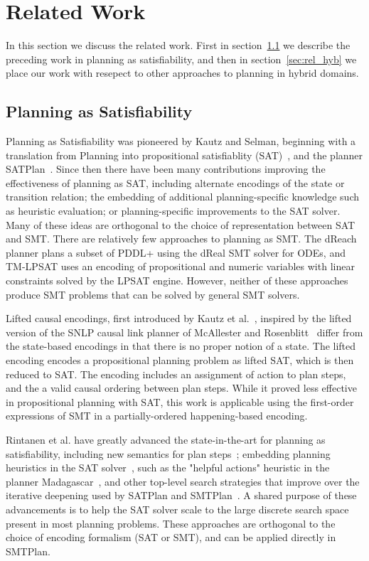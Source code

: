 \section{Related Work}\label{sec:related_work}

In this section we discuss the related work. First in section~\ref{sec:rel_sat} we describe the preceding work in planning as satisfiability, and then in section~\ref{sec:rel_hyb} we place our work with resepect to other approaches to planning in hybrid domains.

\subsection{Planning as Satisfiability}\label{sec:rel_sat}

Planning as Satisfiability was pioneered by Kautz and Selman, beginning with a translation from Planning into propositional satisfiablity (SAT)~\cite{kau92}, and the planner SATPlan~\cite{kau06}. Since then there have been many contributions improving the effectiveness of planning as SAT, including alternate encodings of the state or transition relation; the embedding of additional planning-specific knowledge such as heuristic evaluation; or planning-specific improvements to the SAT solver. Many of these ideas are orthogonal to the choice of representation between SAT and SMT.
%
There are relatively few approaches to planning as SMT. The {\sc dReach} planner plans a subset of PDDL+ using the {\sc dReal} SMT solver for ODEs, and {\sc TM-LPSAT} uses an encoding of propositional and numeric variables with linear constraints solved by the LPSAT engine. However, neither of these approaches produce SMT problems that can be solved by general SMT solvers.

Lifted causal encodings, first introduced by Kautz et al.~\cite{kau96a}, inspired by the lifted version of the SNLP causal link planner of McAllester and Rosenblitt~\cite{mca91} differ from the state-based encodings in that there is no proper notion of a state. The lifted encoding encodes a propositional planning problem as lifted SAT, which is then reduced to SAT. The encoding includes an assignment of action to plan steps, and the a valid causal ordering between plan steps. While it proved less effective in propositional planning with SAT, this work is applicable using the first-order expressions of SMT in a partially-ordered happening-based encoding.

Rintanen et al. have greatly advanced the state-in-the-art for planning as satisfiability, including new semantics for plan steps~\cite{rin06}; embedding planning heuristics in the SAT solver~\cite{rin10a}, such as the "helpful actions" heuristic in the planner {\sc Madagascar}~\cite{rin10}, and other top-level search strategies that improve over the iterative deepening used by SATPlan and SMTPlan~\cite{rin04}. A shared purpose of these advancements is to help the SAT solver scale to the large discrete search space present in most planning problems. These approaches are orthogonal to the choice of encoding formalism (SAT or SMT), and can be applied directly in SMTPlan.

